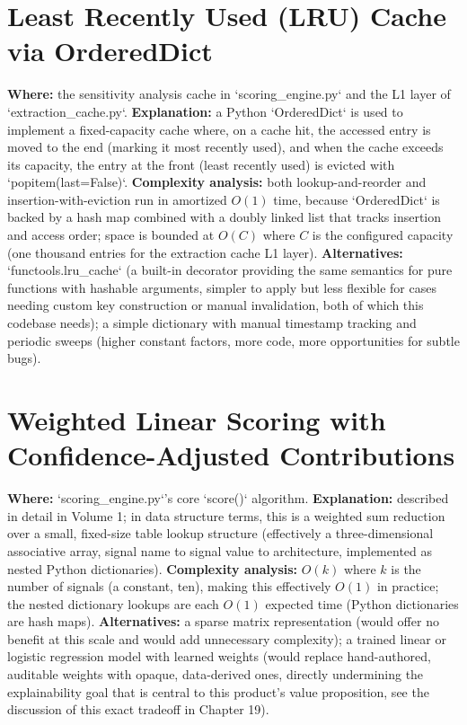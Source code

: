 \documentclass[11pt,a4paper]{report}
\begin{document}
\section{Least Recently Used (LRU) Cache via OrderedDict}

\textbf{Where:} the sensitivity analysis cache in `scoring\_engine.py` and the L1 layer of `extraction\_cache.py`.
\textbf{Explanation:} a Python `OrderedDict` is used to implement a fixed-capacity cache where, on a cache hit, the accessed entry is moved to the end (marking it most recently used), and when the cache exceeds its capacity, the entry at the front (least recently used) is evicted with `popitem(last=False)`.
\textbf{Complexity analysis:} both lookup-and-reorder and insertion-with-eviction run in amortized $O(1)$ time, because `OrderedDict` is backed by a hash map combined with a doubly linked list that tracks insertion and access order; space is bounded at $O(C)$ where $C$ is the configured capacity (one thousand entries for the extraction cache L1 layer).
\textbf{Alternatives:} `functools.lru\_cache` (a built-in decorator providing the same semantics for pure functions with hashable arguments, simpler to apply but less flexible for cases needing custom key construction or manual invalidation, both of which this codebase needs); a simple dictionary with manual timestamp tracking and periodic sweeps (higher constant factors, more code, more opportunities for subtle bugs).

\section{Weighted Linear Scoring with Confidence-Adjusted Contributions}

\textbf{Where:} `scoring\_engine.py`'s core `score()` algorithm.
\textbf{Explanation:} described in detail in Volume 1; in data structure terms, this is a weighted sum reduction over a small, fixed-size table lookup structure (effectively a three-dimensional associative array, signal name to signal value to architecture, implemented as nested Python dictionaries).
\textbf{Complexity analysis:} $O(k)$ where $k$ is the number of signals (a constant, ten), making this effectively $O(1)$ in practice; the nested dictionary lookups are each $O(1)$ expected time (Python dictionaries are hash maps).
\textbf{Alternatives:} a sparse matrix representation (would offer no benefit at this scale and would add unnecessary complexity); a trained linear or logistic regression model with learned weights (would replace hand-authored, auditable weights with opaque, data-derived ones, directly undermining the explainability goal that is central to this product's value proposition, see the discussion of this exact tradeoff in Chapter 19).
\end{document}
